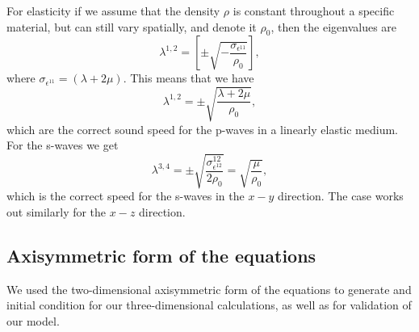 \documentclass{article}
\begin{document}
For elasticity if we assume that the density $\rho$ is constant throughout a specific material, but can still 
vary spatially, and denote it $\rho_0$, then the eigenvalues are\\
\begin{equation}
\lambda^{1,2} = \left[\pm \sqrt{-\frac{\sigma_{\epsilon^{11}}}{\rho_0}}\right],
\end{equation}
where $\sigma_{\epsilon^{11}} = (\lambda+2\mu)$.  This means that we have
\begin{equation}
\lambda^{1,2} = \pm \sqrt{\frac{\lambda+2 \mu}{\rho_0}},
\end{equation}
which are the correct sound speed for the p-waves in a linearly elastic medium.  For the s-waves we get
\begin{equation}
\lambda^{3,4} = \pm \sqrt{\frac{\sigma^{12}_{\epsilon^{12}}}{2\rho_0}} = \sqrt{\frac{\mu}{\rho_0}},
\end{equation}
which is the correct speed for the s-waves in the $x-y$ direction.  The case works out similarly for the $x-
z$ direction. 
\subsection{Axisymmetric form of the equations}
\label{sec:axisym}
We used the two-dimensional axisymmetric form of the equations to generate and initial condition for our 
three-dimensional calculations, as well as for validation of our model.  
\end{document}
